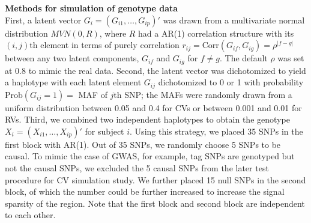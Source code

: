 \documentclass[12pt]{article}
\begin{document}

\textbf{Methods for simulation of genotype data}\\
First, a latent vector $G_i = (G_{i1}, \ldots, G_{ip})'$ was drawn from a {multivariate normal distribution} $MVN(0,R)$, where $R$ had a AR(1) correlation structure with its $(i,j)$th element in terms of purely correlation $r_{ij} =\textrm{Corr} (G_{if}, G_{ig}) = \rho ^ { |f - g| }$ between any two latent components, $G_{if}$ and $G_{ig}$ for $f \neq g$. The default $\rho$ was set at  $0.8$ to mimic the real data. Second, the latent vector was dichotomized to yield a haplotype with each latent element $G_{ij}$ dichotomized to 0 or 1 with probability $\textrm{Prob} (G_{ij} = 1) = $ MAF of $j$th SNP; the MAFs were randomly drawn from a uniform distribution between 0.05 and 0.4 for CVs or between 0.001 and 0.01 for RVs. Third, we combined two independent haplotypes to obtain the genotype $X_i = (X_{i1}, \ldots, X_{ip})' $ for subject $i$. 
Using this strategy, we placed 35 SNPs in the first block with AR(1). Out of 35 SNPs, we randomly choose 5 SNPs to be causal. To mimic the case of GWAS, for example, tag SNPs are genotyped but not the causal SNPs, we excluded the 5 causal SNPs from the later test procedure for CV simulation study. We further placed 15 null SNPs in the second block, of which the number could be further increased to increase the signal sparsity of the region. Note that the first block and second block are independent to each other. 
\end{document}
